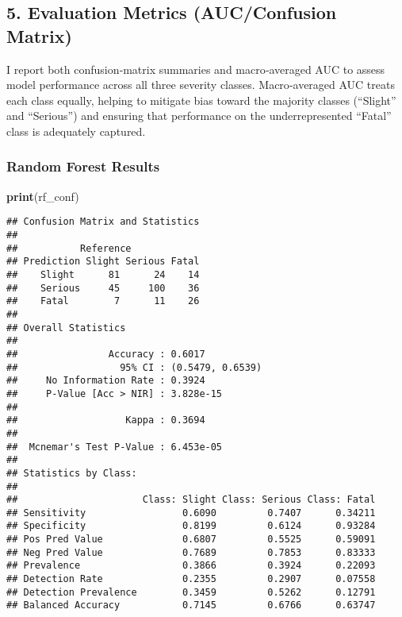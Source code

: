 \documentclass[
]{article}
\newenvironment{Shaded}{\begin{snugshade}}{\end{snugshade}}
\newcommand{\FunctionTok}[1]{\textcolor[rgb]{0.13,0.29,0.53}{\textbf{#1}}}
\newcommand{\NormalTok}[1]{#1}
\begin{document}
\subsection{5. Evaluation Metrics (AUC/Confusion
Matrix)}\label{evaluation-metrics-aucconfusion-matrix}

I report both confusion‐matrix summaries and macro‐averaged AUC to
assess model performance across all three severity classes.
Macro‐averaged AUC treats each class equally, helping to mitigate bias
toward the majority classes (``Slight'' and ``Serious'') and ensuring
that performance on the underrepresented ``Fatal'' class is adequately
captured.

\subsubsection{Random Forest Results}\label{random-forest-results}

\begin{Shaded}
\begin{Highlighting}[]
\FunctionTok{print}\NormalTok{(rf\_conf)}
\end{Highlighting}
\end{Shaded}

\begin{verbatim}
## Confusion Matrix and Statistics
## 
##           Reference
## Prediction Slight Serious Fatal
##    Slight      81      24    14
##    Serious     45     100    36
##    Fatal        7      11    26
## 
## Overall Statistics
##                                           
##                Accuracy : 0.6017          
##                  95% CI : (0.5479, 0.6539)
##     No Information Rate : 0.3924          
##     P-Value [Acc > NIR] : 3.828e-15       
##                                           
##                   Kappa : 0.3694          
##                                           
##  Mcnemar's Test P-Value : 6.453e-05       
## 
## Statistics by Class:
## 
##                      Class: Slight Class: Serious Class: Fatal
## Sensitivity                 0.6090         0.7407      0.34211
## Specificity                 0.8199         0.6124      0.93284
## Pos Pred Value              0.6807         0.5525      0.59091
## Neg Pred Value              0.7689         0.7853      0.83333
## Prevalence                  0.3866         0.3924      0.22093
## Detection Rate              0.2355         0.2907      0.07558
## Detection Prevalence        0.3459         0.5262      0.12791
## Balanced Accuracy           0.7145         0.6766      0.63747
\end{verbatim}
\end{document}
